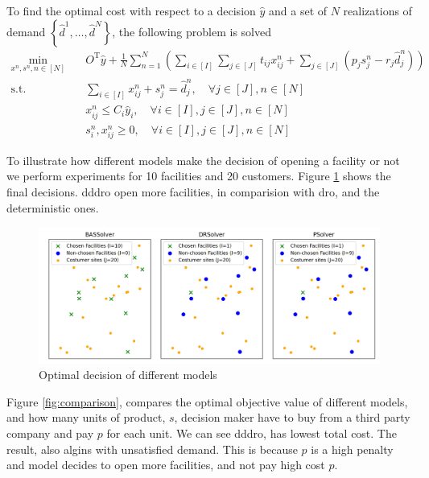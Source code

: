 \documentclass[12pt, letterpaper]{article}
\newcommand{\T}{\mathrm{T}}
\begin{document}
	To find the optimal cost with respect to a decision $\hat{y}$ and a set of $N$ realizations of demand $\left\{\hat{d}^1, \dots, \hat{d}^N\right\}$, the following problem is solved
	\begin{subequations}
		\begin{align}
			\min_{x^n, s^n, n \in [N]} &\quad O^\T\hat{y} + \frac{1}{N}\sum_{n = 1}^{N} \left(\sum_{i \in [I]} \sum_{j \in [J]} t_{ij}x_{ij}^n + \sum_{j \in [J]}(p_j s_{j}^n - r_j \hat{d}_j^n)\right) \\
			\text{s.t.} &\quad \sum_{i \in [I]} x_{ij}^n + s_j^n = \hat{d}_j^n, \quad \forall j \in [J], n \in [N] \\
			&\quad x_{ij}^n \le C_i \hat{y}_i, \quad \forall i \in [I], j \in [J], n \in [N] \\
			&\quad s_i^n, x_{ij}^n \ge 0, \quad \forall i \in [I], j \in [J], n \in [N]
		\end{align}
	\end{subequations}
	
To illustrate how different models make the decision of opening a facility or not we perform experiments for 10 facilities and 20 customers. Figure \ref{fig:decisions} shows the final decisions. \gls{dddro} open more facilities, in comparision with \gls{dro}, and the deterministic ones.


	\begin{figure}[h!]
		\includegraphics[width=\textwidth]{../figure/chosen_facility_costumer_site_pos.png}
		\caption{Optimal decision of different models}
		\label{fig:decisions}		
	\end{figure}
	
	Figure \ref{fig:comparison}, compares the optimal objective value of different models, and how many units of product, $s$, decision maker have to buy from a third party company and pay $p$ for each unit. We can see \gls{dddro}, has lowest total cost. The result, also algins with unsatisfied demand. This is because $p$ is a high penalty and model decides to open more facilities, and not pay high cost $p$.
\end{document}
